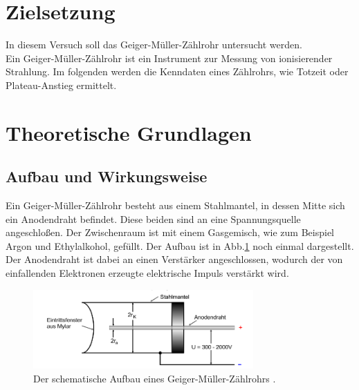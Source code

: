 \section{Zielsetzung}
In diesem Versuch soll das Geiger-Müller-Zählrohr untersucht werden.\\
Ein Geiger-Müller-Zählrohr ist ein Instrument zur Messung von ionisierender Strahlung.
Im folgenden werden die Kenndaten eines Zählrohrs, wie Totzeit oder Plateau-Anstieg ermittelt.



\section{Theoretische Grundlagen}

\subsection{Aufbau und Wirkungsweise}

\noindent
Ein Geiger-Müller-Zählrohr besteht aus einem Stahlmantel, in dessen Mitte sich ein Anodendraht befindet. Diese beiden sind an eine Spannungsquelle angeschloßen.
Der Zwischenraum ist mit einem Gasgemisch, wie zum Beispiel Argon und Ethylalkohol, gefüllt. Der Aufbau ist in Abb.\ref{img:aufbau} noch einmal dargestellt. 
Der Anodendraht ist dabei an einen
Verstärker angeschlossen, wodurch der von einfallenden Elektronen erzeugte elektrische Impuls verstärkt wird.

\begin{figure}[H]
    \centering
    \includegraphics[width=0.75\textwidth]{images/Aufbau.PNG}
    \caption{Der schematische Aufbau eines Geiger-Müller-Zählrohrs \protect \cite{V703}.}
    \label{img:aufbau}
\end{figure}

